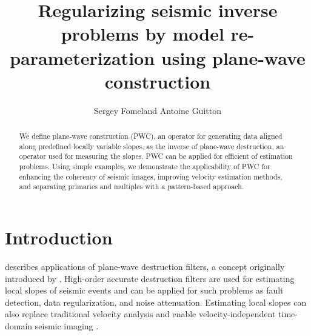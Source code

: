 \title{Regularizing seismic inverse
problems by model re-parameterization using plane-wave construction}

\renewcommand{\thefootnote}{\fnsymbol{footnote}}


\author{Sergey Fomel\footnotemark[1] and
  Antoine Guitton\footnotemark[2]}

\address{
\footnotemark[1]Bureau of Economic Geology, \\
John A. and Katherine G. Jackson School of Geosciences \\
The University of Texas at Austin \\
University Station, Box X \\
Austin, TX 78713-8972 \\
\footnotemark[2]3DGeo Development Inc. \\
4633 Old Ironsides Drive, Suite 401 \\
Santa Clara, CA 95054}

\maketitle

\begin{abstract}
  We define plane-wave construction (PWC), an operator for generating
  data aligned along predefined locally variable slopes, as the
  inverse of plane-wave destruction, an operator used for measuring
  the slopes.  PWC can be applied for efficient 
   of   estimation
  problems. Using simple examples, we demonstrate the applicability of
  PWC for enhancing the coherency of seismic images, improving
  velocity estimation methods, and separating primaries and multiples
  with a pattern-based approach.
\end{abstract}

\section{Introduction}

\cite{GEO67-06-19461960} describes applications of plane-wave
destruction filters, a concept originally introduced by \cite{pvi}.
High-order accurate destruction filters are used for estimating local
slopes of seismic events and can be applied for such problems as fault
detection, data regularization, and noise attenuation.  Estimating
local slopes can also replace traditional velocity analysis and enable
velocity-independent time-domain seismic imaging \cite[]{pmig}.

